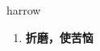 
\begin{frame}
{\huge harrow}
\begin{center}
\begin{enumerate}\Large
  \item \textbf{折磨，使苦恼}
\end{enumerate}
\end{center}
\end{frame}
